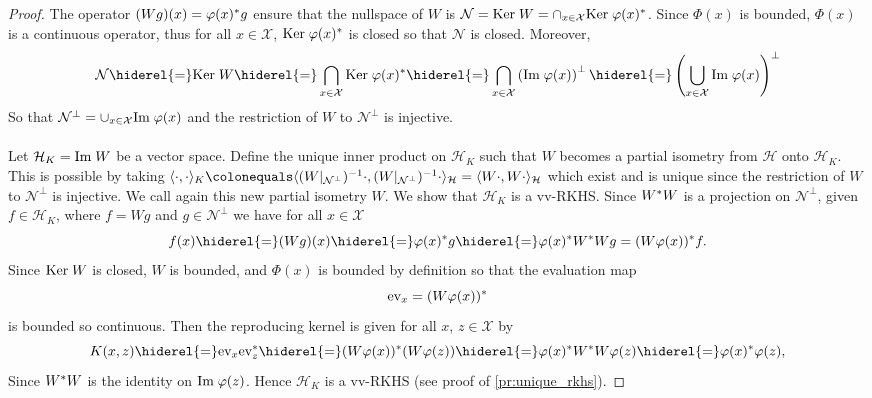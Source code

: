\begin{proof} The operator $(Wg)(x)=\Phi(x)^\adjoint g$ ensure that the nullspace of $W$ is $\mathcal{N}=\Ker W=\cap_{x\in\mathcal{X}}\Ker \Phi(x)^\adjoint$. Since $\Phi(x)$ is bounded, $\Phi(x)$ is a continuous operator, thus for all $x\in\mathcal{X}$, $\Ker \Phi(x)^\adjoint$ is closed so that $\mathcal{N}$ is closed. Moreover,
\begin{dmath*}
\mathcal{N}\hiderel{=}\Ker W\hiderel{=}\bigcap_{x\in\mathcal{X}}\Ker \Phi(x)^\adjoint\hiderel{=}\bigcap_{x\in\mathcal{X}}\left(\Ima \Phi(x)\right)^{\perp}\hiderel{=}\left(\bigcup_{x\in\mathcal{X}}\Ima \Phi(x)\right)^{\perp}
\end{dmath*}
So that $\mathcal{N}^\perp=\cup_{x\in\mathcal{X}}\Ima \Phi(x)$ and the restriction of $W$ to $\mathcal{N}^{\perp}$ is injective.
\paragraph{}
Let $\mathcal{H}_K=\text{Im}\; W$ be a vector space. Define the unique inner product on $\mathcal{H}_K$ such that $W$ becomes a partial isometry from $\mathcal{H}$ onto $\mathcal{H}_K$. This is possible by taking $\inner{\cdot,\cdot}_K\colonequals\inner{(W|_{\mathcal{N}^{\perp}})^{-1}\cdot, (W|_{\mathcal{N}^{\perp}})^{-1}\cdot}_{\mathcal{H}}=\inner{W\cdot,W\cdot}_{\mathcal{H}}$
which exist and is unique since the restriction of $W$ to $\mathcal{N}^{\perp}$ is injective. We call again this new partial isometry $W$. We show that $\mathcal{H}_K$ is a \acl{vv-RKHS}. Since $W^* W$ is a projection on $\mathcal{N}^{\perp}$, given $f\in\mathcal{H}_K$, where $f=Wg$ and $g\in\mathcal{N}^{\perp}$ we have for all $x\in\mathcal{X}$
\begin{dmath*}
f(x)\hiderel{=}(Wg)(x)\hiderel{=}\Phi(x)^\adjoint g\hiderel{=}\Phi(x)^\adjoint W^\adjoint Wg=(W\Phi(x))^\adjoint f.
\end{dmath*}
Since $\text{Ker}\; W$ is closed, $W$ is bounded, and $\Phi(x)$ is bounded by definition so that the evaluation map
\begin{dmath*}
\text{ev}_x=(W\Phi(x))^\adjoint
\end{dmath*}
is bounded so continuous. Then the reproducing kernel is given for all $x$, $z\in\mathcal{X}$ by
\begin{dmath*}
K(x,z)\hiderel{=}\text{ev}_x\text{ev}_z^\adjoint\hiderel{=}(W\Phi(x))^\adjoint(W\Phi(z))\hiderel{=}\Phi(x)^\adjoint W^\adjoint W\Phi(z)\hiderel{=}\Phi(x)^\adjoint\Phi(z),
\end{dmath*}
Since $W^* W$ is the identity on $\Ima \Phi(z)$. Hence $\mathcal{H}_K$ is a \acs{vv-RKHS} (see proof of \cref{pr:unique_rkhs}).
\end{proof}
